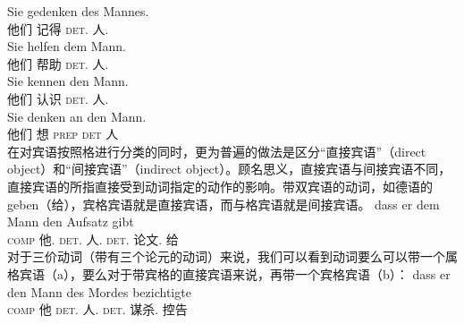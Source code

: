 \eal
\ex 
\gll Sie gedenken des Mannes.\\
	 他们 记得 \textsc{det}.\gen{} 人.\gen{}\\
\ex 
\gll Sie helfen dem Mann.\\
	 他们 帮助 \textsc{det}.\dat{} 人.\dat{}\\
\ex 
\gll Sie kennen den Mann.\\
	 他们 认识 \textsc{det}.\acc{} 人.\acc{}\\
\ex 
\gll Sie denken an den Mann.\\
	 他们 想 \textsc{prep} \textsc{det} 人\\
\zl
在对宾语按照格进行分类的同时，更为普遍的做法是区分“直接宾语”（direct object）和“间接宾语”（indirect object）。顾名思义，直接宾语与间接宾语不同，直接宾语的所指直接受到动词指定的动作的影响。带双宾语的动词，如德语的geben（给），宾格宾语就是直接宾语，而与格宾语就是间接宾语。
\ea
\gll dass er dem Mann den Aufsatz gibt\\
	 \textsc{comp} 他.\nom{} \textsc{det}.\dat{} 人.\dat{} \textsc{det}.\acc{} 论文.\acc{} 给\\
\z
对于三价动词（带有三个论元的动词）来说，我们可以看到动词要么可以带一个属格宾语（a），要么对于带宾格的直接宾语来说，再带一个宾格宾语（b）：
\eal
\ex 
\gll dass er den Mann des Mordes bezichtigte\\
	 \textsc{comp} 他 \textsc{det}.\acc{} 人.\acc{} \textsc{det}.\gen{} 谋杀.\gen{} 控告\\
